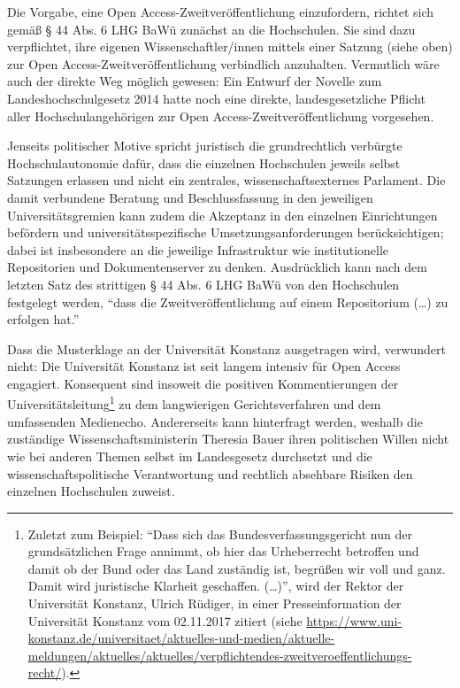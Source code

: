 \documentclass[a4paper,
fontsize=11pt,
oneside,
numbers=noperiodatend,
parskip=half-,
bibliography=totoc,
final
]{scrartcl}
\begin{document}
Die Vorgabe, eine Open Access-Zweitveröffentlichung einzufordern,
richtet sich gemäß § 44 Abs. 6 LHG BaWü zunächst an die Hochschulen. Sie
sind dazu verpflichtet, ihre eigenen Wissenschaftler/innen mittels einer
Satzung (siehe oben) zur Open Access-Zweitveröffentlichung verbindlich
anzuhalten. Vermutlich wäre auch der direkte Weg möglich gewesen: Ein
Entwurf der Novelle zum Landeshochschulgesetz 2014 hatte noch eine
direkte, landesgesetzliche Pflicht aller Hochschulangehörigen zur Open
Access-Zweitveröffentlichung vorgesehen.

Jenseits politischer Motive spricht juristisch die grundrechtlich
verbürgte Hochschulautonomie dafür, dass die einzelnen Hochschulen
jeweils selbst Satzungen erlassen und nicht ein zentrales,
wissenschaftsexternes Parlament. Die damit verbundene Beratung und
Beschlussfassung in den jeweiligen Universitätsgremien kann zudem die
Akzeptanz in den einzelnen Einrichtungen befördern und
universitätsspezifische Umsetzungsanforderungen berücksichtigen; dabei
ist insbesondere an die jeweilige Infrastruktur wie institutionelle
Repositorien und Dokumentenserver zu denken. Ausdrücklich kann nach dem
letzten Satz des strittigen § 44 Abs. 6 LHG BaWü von den Hochschulen
festgelegt werden, \enquote{dass die Zweitveröffentlichung auf einem
Repositorium (\ldots{}) zu erfolgen hat.}

Dass die Musterklage an der Universität Konstanz ausgetragen wird,
verwundert nicht: Die Universität Konstanz ist seit langem intensiv für
Open Access engagiert. Konsequent sind insoweit die positiven
Kommentierungen der Universitätsleitung\footnote{Zuletzt zum Beispiel:
  \enquote{Dass sich das Bundesverfassungsgericht nun der
  grundsätzlichen Frage annimmt, ob hier das Urheberrecht betroffen und
  damit ob der Bund oder das Land zuständig ist, begrüßen wir voll und
  ganz. Damit wird juristische Klarheit geschaffen. (\ldots{})}, wird
  der Rektor der Universität Konstanz, Ulrich Rüdiger, in einer
  Presseinformation der Universität Konstanz vom 02.11.2017 zitiert
  (siehe
  \url{https://www.uni-konstanz.de/universitaet/aktuelles-und-medien/aktuelle-meldungen/aktuelles/aktuelles/verpflichtendes-zweitveroeffentlichungs-recht/}).}
zu dem langwierigen Gerichtsverfahren und dem umfassenden Medienecho.
Andererseits kann hinterfragt werden, weshalb die zuständige
Wissenschaftsministerin Theresia Bauer ihren politischen Willen nicht
wie bei anderen Themen selbst im Landesgesetz durchsetzt und die
wissenschaftspolitische Verantwortung und rechtlich absehbare Risiken
den einzelnen Hochschulen zuweist.
\end{document}
